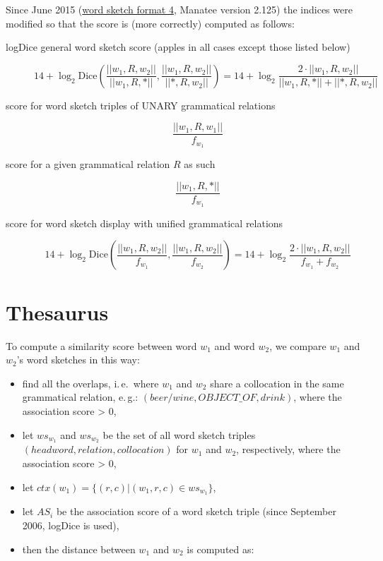 \documentclass{article}
\begin{document}
Since June 2015 (\href{https://www.sketchengine.co.uk/documentation/wiki/SkE/WordSketchFormat}{word sketch format 4}, Manatee version 2.125) the indices were modified so that the score is (more correctly) computed as follows:
\begin{description}
\item[logDice general word sketch score (apples in all cases except those listed below)]
$$ 14 + \log_2 \text{Dice}\left(\frac{||w_1,R,w_2||}{||w_1,R,*||}, \frac{||w_1,R,w_2||}{||*,R,w_2||}\right) = 14 + \log_2 \frac{2 \cdot ||w_1,R,w_2||}{||w_1,R,*|| + ||*,R,w_2||} $$

\item[score for word sketch triples of UNARY grammatical relations]
$$ \frac{||w_1,R,w_1||}{f_{w_1}} $$

\item[score for a given grammatical relation $R$ as such]
$$ \frac{||w_1,R,*||}{f_{w_1}} $$

\item[score for word sketch display with unified grammatical relations]
$$ 14 + \log_2 \text{Dice}\left(\frac{||w_1,R,w_2||}{f_{w_1}}, \frac{||w_1,R,w_2||}{f_{w_2}}\right) = 14 + \log_2 \frac{2 \cdot ||w_1,R,w_2||}{f_{w_1} + f_{w_2}} $$

\end{description}



\section{Thesaurus}

To compute a similarity score between word $w_1$ and word $w_2$, we compare $w_1$ and $w_2$'s word sketches in this way:
\begin{itemize}
  \item find all the overlaps, i.\,e.\ where $w_1$ and $w_2$ share a collocation in the same grammatical relation, e.\,g.: $(beer/wine, OBJECT\_OF, drink)$, where the association score > 0,
  \item let $ws_{w_1}$ and $ws_{w_2}$ be the set of all word sketch triples $(headword, relation, collocation)$ for $w_1$ and $w_2$, respectively, where the association score > 0,
  \item let $ctx(w_1) = \{(r,c) | (w_1,r,c) \in ws_{w_1}\}$,
  \item let $AS_i$ be the association score of a word sketch triple (since September 2006, logDice is used),
  \item then the distance between $w_1$ and $w_2$ is computed as:
\end{itemize}
\end{document}
